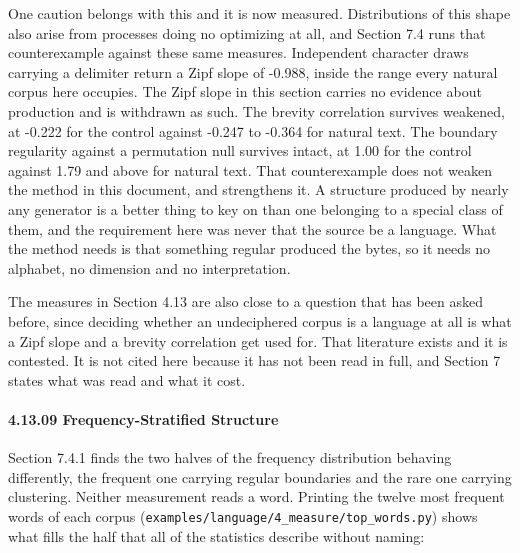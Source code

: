 One caution belongs with this and it is now measured. Distributions of this shape also arise from processes doing no optimizing at all, and Section 7.4 runs that counterexample against these same measures. Independent character draws carrying a delimiter return a Zipf slope of -0.988, inside the range every natural corpus here occupies. The Zipf slope in this section carries no evidence about production and is withdrawn as such. The brevity correlation survives weakened, at -0.222 for the control against -0.247 to -0.364 for natural text. The boundary regularity against a permutation null survives intact, at 1.00 for the control against 1.79 and above for natural text. That counterexample does not weaken the method in this document, and strengthens it. A structure produced by nearly any generator is a better thing to key on than one belonging to a special class of them, and the requirement here was never that the source be a language. What the method needs is that something regular produced the bytes, so it needs no alphabet, no dimension and no interpretation.

The measures in Section 4.13 are also close to a question that has been asked before, since deciding whether an undeciphered corpus is a language at all is what a Zipf slope and a brevity correlation get used for. That literature exists and it is contested. It is not cited here because it has not been read in full, and Section 7 states what was read and what it cost.

\paragraph{4.13.09 Frequency-Stratified Structure}

Section 7.4.1 finds the two halves of the frequency distribution behaving differently, the frequent one carrying regular boundaries and the rare one carrying clustering. Neither measurement reads a word. Printing the twelve most frequent words of each corpus (\texttt{examples/\allowbreak{}language/\allowbreak{}4\_\allowbreak{}measure/\allowbreak{}top\_\allowbreak{}words.\allowbreak{}py}) shows what fills the half that all of the statistics describe without naming:


